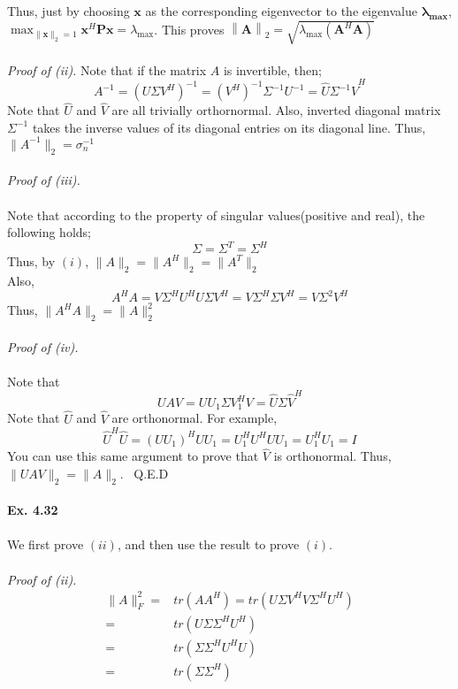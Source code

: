 \documentclass[letterpaper,12pt]{article}
\theoremstyle{definition}
\begin{document}
\begin{spacing}{1.3}{}
Thus, just by choosing $\mathbf{x}$ as the corresponding eigenvector to the eigenvalue $\mathbf{\lambda_{max}}$, \\
$\max_{\| \mathbf{x} \|_2=1} \mathbf{x}^H \mathbf{Px} = \lambda_{\max}$. This proves $\left\| \mathbf{A}\right\|_2 = \sqrt{\lambda_{\max}(\mathbf{A}^H \mathbf{A})}$ \\\\
\emph{Proof of (ii). } Note that if the matrix $A$ is invertible, then;
\[A^{-1} = (U \Sigma V^H)^{-1} = (V^H)^{-1} \Sigma^{-1} U^{-1} = \hat{U} \Sigma^{-1} \hat{V}^H \]
Note that $\hat{U}$ and $\hat{V}$ are all trivially orthornormal. Also, inverted diagonal matrix $\Sigma^{-1}$ takes the inverse values of its diagonal entries on its diagonal line. Thus, $\|A^{-1}\|_2 = \sigma_{n}^{-1} $ \\\\
\emph{Proof of (iii). } \\\\
Note that according to the property of singular values(positive and real), the following holds;
\[\Sigma = \Sigma^T = \Sigma^H \]
Thus, by $(i)$, $\|A\|_2 = \|A^H\|_2 = \|A^T\|_2$ \\
Also,
\[A^H A = V \Sigma^H U^H U \Sigma V^H = V \Sigma^H \Sigma V^H = V \Sigma^2 V^H\]
Thus, $\|A^H A\|_2 = \|A\|_{2}^{2}$ \\\\
\emph{Proof of (iv).} \\\\
Note that
\[UAV = U U_1 \Sigma V_{1}^H V = \hat{U} \Sigma \hat{V}^H\]
Note that $\hat{U}$ and $\hat{V}$ are orthonormal. For example,
\[\hat{U}^H \hat{U} = (U U_1)^H U U_1 = U_{1}^H U^H U U_1 = U_{1}^H U_1 = I\]
You can use this same argument to prove that $\hat{V}$ is orthonormal. Thus, $\|UAV\|_2 = \|A\|_2$. \ Q.E.D \\\\
\textbf{Ex. 4.32}\\\\
We first prove $(ii)$, and then use the result to prove $(i)$. \\\\
\emph{Proof of (ii).}
\begin{align*}
   \|A\|_{F}^{2} =& tr(A A^H) = tr(U \Sigma V^H V \Sigma^H U^H) \\
                 =& tr(U \Sigma \Sigma^H U^H) \\
                 =& tr(\Sigma \Sigma^H U^H U) \\
                 =& tr(\Sigma \Sigma^H) \\

\end{align*}
\end{spacing}
\end{document}

